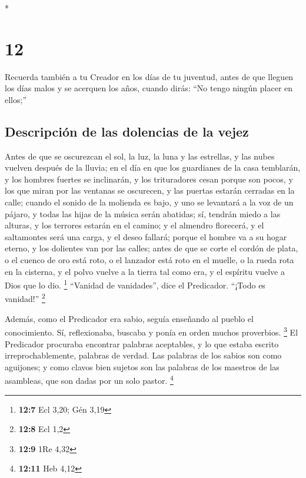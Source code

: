 \begin{paracol}{2}
\begin{otherlanguage}{english}
\end{otherlanguage}

\switchcolumn[0]*

\hypertarget{section-22}{%
\section{12}\label{section-22}}

 Recuerda también a tu Creador en los días de tu juventud,
antes de que lleguen los días malos y se acerquen los años, cuando
dirás: ``No tengo ningún placer en ellos;''

\hypertarget{descripciuxf3n-de-las-dolencias-de-la-vejez}{%
\subsection{Descripción de las dolencias de la
vejez}\label{descripciuxf3n-de-las-dolencias-de-la-vejez}}

 Antes de que se oscurezcan el sol, la luz, la luna y las
estrellas, y las nubes vuelven después de la lluvia;  en
el día en que los guardianes de la casa temblarán, y los hombres fuertes
se inclinarán, y los trituradores cesan porque son pocos, y los que
miran por las ventanas se oscurecen,  y las puertas
estarán cerradas en la calle; cuando el sonido de la molienda es bajo, y
uno se levantará a la voz de un pájaro, y todas las hijas de la música
serán abatidas;  sí, tendrán miedo a las alturas, y los
terrores estarán en el camino; y el almendro florecerá, y el saltamontes
será una carga, y el deseo fallará; porque el hombre va a su hogar
eterno, y los dolientes van por las calles;  antes de que
se corte el cordón de plata, o el cuenco de oro está roto, o el lanzador
está roto en el muelle, o la rueda rota en la cisterna,  y
el polvo vuelve a la tierra tal como era, y el espíritu vuelve a Dios
que lo dio. \footnote{\textbf{12:7} Ecl 3,20; Gén 3,19} 
``Vanidad de vanidades'', dice el Predicador. ``¡Todo es vanidad!''
\footnote{\textbf{12:8} Ecl 1,2}

 Además, como el Predicador era sabio, seguía enseñando al
pueblo el conocimiento. Sí, reflexionaba, buscaba y ponía en orden
muchos proverbios. \footnote{\textbf{12:9} 1Re 4,32}  El
Predicador procuraba encontrar palabras aceptables, y lo que estaba
escrito irreprochablemente, palabras de verdad.  Las
palabras de los sabios son como aguijones; y como clavos bien sujetos
son las palabras de los maestros de las asambleas, que son dadas por un
solo pastor. \footnote{\textbf{12:11} Heb 4,12}


\end{paracol}
